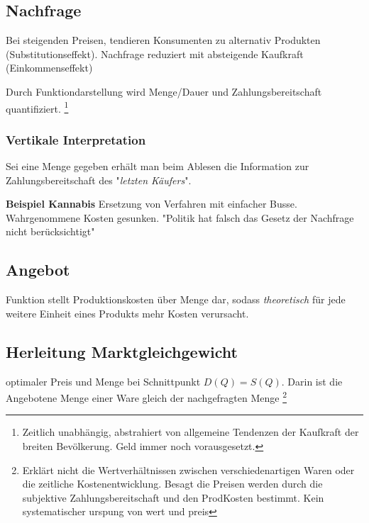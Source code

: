 
\subsection{Nachfrage}

\begin{definition}
     Bei steigenden Preisen, tendieren Konsumenten zu alternativ Produkten (Substitutionseffekt). Nachfrage reduziert mit absteigende Kaufkraft (Einkommenseffekt)  
\end{definition}
Durch Funktiondarstellung wird Menge/Dauer und Zahlungsbereitschaft quantifiziert. \footnote{Zeitlich unabhängig, abstrahiert von allgemeine Tendenzen der Kaufkraft der breiten Bevölkerung. Geld immer noch vorausgesetzt.}  
\subsubsection{Vertikale Interpretation}
Sei eine Menge gegeben erhält man beim Ablesen die Information zur Zahlungsbereitschaft des "\textit{letzten Käufers}".

\textbf{Beispiel Kannabis}
Ersetzung von Verfahren mit einfacher Busse. Wahrgenommene Kosten gesunken. "Politik hat falsch das Gesetz der Nachfrage nicht berücksichtigt"

\subsection{Angebot}

\begin{definition}
\end{definition}

Funktion stellt Produktionskosten über Menge dar, sodass \textit{theoretisch} für jede weitere Einheit eines Produkts mehr Kosten verursacht.

\subsection{Herleitung Marktgleichgewicht}

\begin{definition}
     optimaler Preis und Menge bei Schnittpunkt $D(Q) = S(Q)$. Darin ist die Angebotene Menge einer Ware gleich der nachgefragten Menge \footnote{Erklärt nicht die Wertverhältnissen zwischen verschiedenartigen Waren oder die zeitliche Kostenentwicklung. Besagt die Preisen werden durch die subjektive Zahlungsbereitschaft und den ProdKosten bestimmt. Kein systematischer urspung von wert und preis}
\end{definition}

